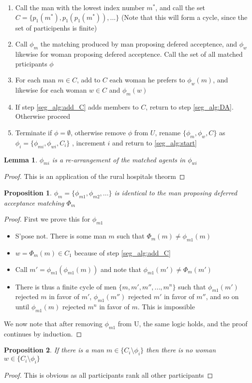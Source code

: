 \documentclass[WP]{AEA}
\newtheorem{prop}{Proposition}
\newtheorem{lemma}{Lemma}
\begin{document}
\begin{enumerate}
	\item \label{seg_alg:start} Call the man with the lowest index number $m^*$, and call the set $C = \{p_1(m^*), p_1(p_1(m^*)), ...\}$ (Note that this will form a cycle, since the set of participenhs is finite)
	\item \label{seg_alg:DA} Call $\phi_m$ the matching produced by man proposing defered acceptence, and $\phi_w$ likewise for woman proposing defered acceptence.  Call the set of all matched prticipants $\phi$ 
	\item \label{seg_alg:add_C} For each man $m \in C$, add  to $C$ each woman he prefers to $\phi_w(m)$, and likewise for each woman $w \in C$ and $\phi_m(w)$
	\item If step \ref{seg_alg:add_C} adds members to $C$, return to step \ref{seg_alg:DA}.  Otherwise proceed
	\item Terminate if $\phi =  \emptyset$, otherwise remove $\phi$ from $U$, rename $\{\phi_m, \phi_w, C\}$ as $\phi_i = \{\phi_{mi}, \phi_{wi}, C_i\}$ , increment $i$ and return to \ref{seg_alg:start}
	
\end{enumerate}

\begin{lemma}
	$\phi_{mi}$ is a re-arrangement of the matched agents in $\phi_{wi}$
\end{lemma}
\begin{proof}
	This is an application of the rural hospitals theorm
\end{proof}

\begin{prop}
	$\phi_m = \{\phi_{m1}, \phi_{m2}, ...\}$ is identical to the man proposing deferred acceptance matching $\Phi_m $
\end{prop}
\begin{proof}
	First we prove this for $\phi_{m1}$
	\begin{itemize}
		\item S'pose not. There is some man $m$ such that $\Phi_m(m) \neq \phi_{m1}(m)$
		\item $w = \Phi_m(m) \in C_1$ because of step \ref{seg_alg:add_C}
		\item Call $m' =  \phi_{m1}(\phi_{m1}(m)) $ and note that $ \phi_{m1}(m') \neq \Phi_m(m')$ 
		\item There is thus a finite cycle of men $\{m, m', m'', ... , m^n\}$ such that $ \phi_{m1}(m') $ rejected $m$ in favor of $m'$, $ \phi_{m1}(m'') $ rejected $m'$ in favor of $m''$, and so on until $ \phi_{m1}(m) $ rejected $m^n$ in favor of $m$.  This is impossible
	\end{itemize}
We now note that after removing $\phi_{m1}$ from U, the same logic holds, and the proof continues by induction. 
\end{proof}
\begin{prop}
	If there is a man $m \in \{C_i  \setminus \phi_i\}$ then there is no woman $w \in \{C_i  \setminus \phi_i\}$
\end{prop}
\begin{proof}
	This is obvious as all participants rank all other participants
\end{proof}
	
\end{document}
